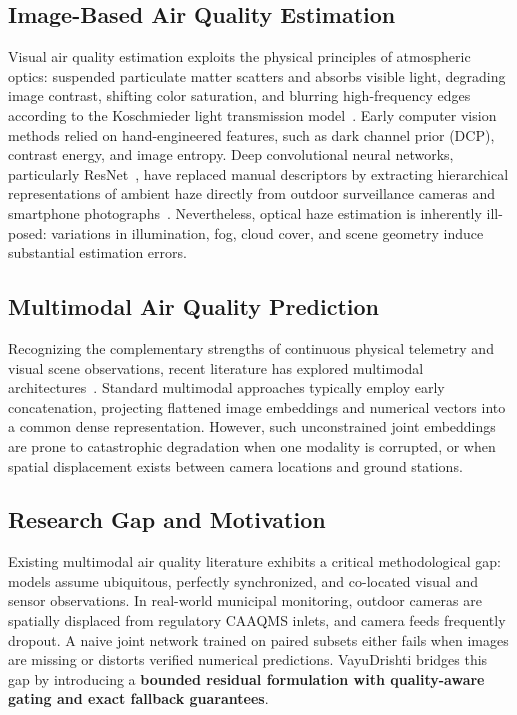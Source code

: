 \documentclass[conference]{IEEEtran}
\begin{document}
\subsection{Image-Based Air Quality Estimation}
Visual air quality estimation exploits the physical principles of atmospheric optics: suspended particulate matter scatters and absorbs visible light, degrading image contrast, shifting color saturation, and blurring high-frequency edges according to the Koschmieder light transmission model~\cite{liu2016particle}. Early computer vision methods relied on hand-engineered features, such as dark channel prior (DCP), contrast energy, and image entropy. Deep convolutional neural networks, particularly ResNet~\cite{he2016resnet}, have replaced manual descriptors by extracting hierarchical representations of ambient haze directly from outdoor surveillance cameras and smartphone photographs~\cite{pan2019pm25, chakma2017image}. Nevertheless, optical haze estimation is inherently ill-posed: variations in illumination, fog, cloud cover, and scene geometry induce substantial estimation errors.

\subsection{Multimodal Air Quality Prediction}
Recognizing the complementary strengths of continuous physical telemetry and visual scene observations, recent literature has explored multimodal architectures~\cite{baltruvsaitis2018multimodal, zhang2020multimodal}. Standard multimodal approaches typically employ early concatenation, projecting flattened image embeddings and numerical vectors into a common dense representation. However, such unconstrained joint embeddings are prone to catastrophic degradation when one modality is corrupted, or when spatial displacement exists between camera locations and ground stations.

\subsection{Research Gap and Motivation}
Existing multimodal air quality literature exhibits a critical methodological gap: models assume ubiquitous, perfectly synchronized, and co-located visual and sensor observations. In real-world municipal monitoring, outdoor cameras are spatially displaced from regulatory CAAQMS inlets, and camera feeds frequently dropout. A naive joint network trained on paired subsets either fails when images are missing or distorts verified numerical predictions. VayuDrishti bridges this gap by introducing a \textbf{bounded residual formulation with quality-aware gating and exact fallback guarantees}.
\end{document}
